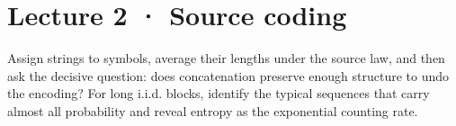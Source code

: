 \clearpage
{\small\tableofcontents}

\clearpage
\section*{Lecture 2 · Source coding}
{}
\begin{strand}
Assign strings to symbols, average their lengths under the source law, and then
ask the decisive question: does concatenation preserve enough structure to undo
the encoding? For long i.i.d. blocks, identify the typical sequences that carry
almost all probability and reveal entropy as the exponential counting rate.
\end{strand}



\clearpage


\clearpage


\clearpage


\clearpage


\clearpage



